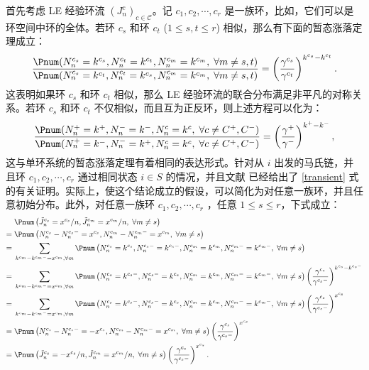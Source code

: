 首先考虑 LE 经验环流 $(J^c_n)_{c\in\mathcal{C}}$。记 $c_1,c_2,\cdots,c_r$ 是一族环，比如，它们可以是环空间中环的全体。若环 $c_s$ 和环 $c_t$ ($1\le s,t\le r$) 相似，那么有下面的暂态涨落定理成立：
\begin{equation}\label{transient}
    \frac{\Pnum(N^{c_s}_n=k^{c_s},N^{c_t}_n=k^{c_t},N^{c_m}_n=k^{c_m},\;\forall m\neq s,t)}
    {\Pnum(N^{c_s}_n=k^{c_t},N^{c_t}_n=k^{c_s},N^{c_m}_n=k^{c_m},\;\forall m\neq s,t)}
    = \left(\frac{\gamma^{c_s}}{\gamma^{c_t}}\right)^{k^{c_s}-k^{c_t}}.
\end{equation}
这表明如果环 $c_s$ 和环 $c_t$ 相似，那么 LE 经验环流的联合分布满足非平凡的对称关系。若环 $c_s$ 和环 $c_t$ 不仅相似，而且互为正反环，则上述方程可以化为：
\begin{equation*}
    \frac{\Pnum(N^+_n=k^+,N^-_n=k^-,N^c_n=k^c,\;\forall c\neq C^+,C^-)}
    {\Pnum(N^+_n=k^-,N^-_n=k^+,N^c_n=k^c,\;\forall c\neq C^+,C^-)}
    = \left(\frac{\gamma^+}{\gamma^-}\right)^{k^+-k^-},
\end{equation*}
这与单环系统的暂态涨落定理有着相同的表达形式。针对从 $i$ 出发的马氏链，并且环 $c_1,c_2,\cdots,c_r$ 通过相同状态 $i\in S$ 的情况，并且文献 \cite{jia2016cycle} 已经给出了 \eqref{transient} 式的有关证明。实际上，使这个结论成立的假设，可以简化为对任意一族环，并且任意初始分布。此外，对任意一族环  $c_1,c_2,\cdots,c_r$ ，任意 $1\le s\le r$，下式成立：
\begin{align*}
&\; \Pnum\left(\tilde{J}^{c_s}_n=x^{c_s}/n,\tilde{J}^{c_m}_n=x^{c_m}/n,\;\forall m\neq s\right) \\
=&\; \Pnum\left(N^{c_s}_n-N^{c_s-}_n=x^{c_s},N^{c_m}_n-N^{c_m-}_n=x^{c_m},\;\forall m\neq s\right) \\
=&\; \sum_{k^{c_m}-k^{c_m-}=x^{c_m},\forall  m }\Pnum\left(N^{c_s}_n=k^{c_s},N^{c_s-}_n=k^{c_s-},  N^{c_m}_n=k^{c_m},N^{c_m-}_n=k^{c_m-},\;\forall m\neq s\right) \\
=&\; \sum_{k^{c_m}-k^{c_m-}=x^{c_m},\forall  m }\Pnum\left(N^{c_s}_n=k^{c_s-},N^{c_s-}_n=k^{c_s}, N^{c_m}_n=k^{c_m},N^{c_m-}_n=k^{c_m-},\;\forall m\neq s\right)\left(\frac{\gamma^{c_s}}{\gamma^{c_s-}}\right)^{k^{c_s}-k^{c_s-}}  \\
=&\; \sum_{k^{c_m}-k^{c_m-}=x^{c_m},\forall  m }\Pnum\left(N^{c_s}_n=k^{c_s-},N^{c_s-}_n=k^{c_s}, N^{c_m}_n=k^{c_m},N^{c_m-}_n=k^{c_m-},\;\forall m\neq s\right)\left(\frac{\gamma^{c_s}}{\gamma^{c_s-}}\right)^{x^{c_s}} \\
=&\; \Pnum\left(N^{c_s}_n-N^{c_s-}_n=-x^{c_s},N^{c_m}_n-N^{c_m-}_n=x^{c_m},\;\forall m\neq s\right)\left(\frac{\gamma^{c_s}}{\gamma^{c_s-}}\right)^{x^{c_s}} \\
=&\; \Pnum\left(\tilde{J}^{c_s}_n=-x^{c_s}/n,\tilde{J}^{c_m}_n=x^{c_m}/n,\;\forall m\neq s\right)\left(\frac{\gamma^{c_s}}{\gamma^{c_s-}}\right)^{x^{c_s}}.
\end{align*}


